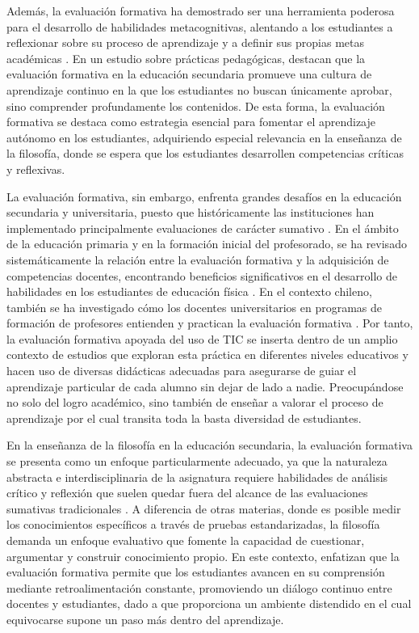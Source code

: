 \documentclass[spanish]{textolivre}
\begin{document}
Además, la evaluación formativa ha demostrado ser una herramienta poderosa para el desarrollo de habilidades metacognitivas, alentando a los estudiantes a reflexionar sobre su proceso de aprendizaje y a definir sus propias metas académicas \cite{galarza-salazar2021}. En un estudio sobre prácticas pedagógicas, \textcite{mendoza2020} destacan que la evaluación formativa en la educación secundaria promueve una cultura de aprendizaje continuo en la que los estudiantes no buscan únicamente aprobar, sino comprender profundamente los contenidos. De esta forma, la evaluación formativa se destaca como estrategia esencial para fomentar el aprendizaje autónomo en los estudiantes, adquiriendo especial relevancia en la enseñanza de la filosofía, donde se espera que los estudiantes desarrollen competencias críticas y reflexivas.

La evaluación formativa, sin embargo, enfrenta grandes desafíos en la educación secundaria y universitaria, puesto que históricamente las instituciones han implementado principalmente evaluaciones de carácter sumativo \cite{hidalgo2021}. En el ámbito de la educación primaria y en la formación inicial del profesorado, se ha revisado sistemáticamente la relación entre la evaluación formativa y la adquisición de competencias docentes, encontrando beneficios significativos en el desarrollo de habilidades en los estudiantes de educación física \cite{jihuallanca2023}. En el contexto chileno, también se ha investigado cómo los docentes universitarios en programas de formación de profesores entienden y practican la evaluación formativa \cite{orellana2020}. Por tanto, la evaluación formativa apoyada del uso de TIC se inserta dentro de un amplio contexto de estudios que exploran esta práctica en diferentes niveles educativos y hacen uso de diversas didácticas adecuadas para asegurarse de guiar el aprendizaje particular de cada alumno sin dejar de lado a nadie. Preocupándose no solo del logro académico, sino también de enseñar a valorar el proceso de aprendizaje por el cual transita toda la basta diversidad de estudiantes. 

En la enseñanza de la filosofía en la educación secundaria, la evaluación formativa se presenta como un enfoque particularmente adecuado, ya que la naturaleza abstracta e interdisciplinaria de la asignatura requiere habilidades de análisis crítico y reflexión que suelen quedar fuera del alcance de las evaluaciones sumativas tradicionales \cite{orellana2020}. A diferencia de otras materias, donde es posible medir los conocimientos específicos a través de pruebas estandarizadas, la filosofía demanda un enfoque evaluativo que fomente la capacidad de cuestionar, argumentar y construir conocimiento propio. En este contexto, \textcite{mendoza2020} enfatizan que la evaluación formativa permite que los estudiantes avancen en su comprensión mediante retroalimentación constante, promoviendo un diálogo continuo entre docentes y estudiantes, dado a que proporciona un ambiente distendido en el cual equivocarse supone un paso más dentro del aprendizaje.
\end{document}
